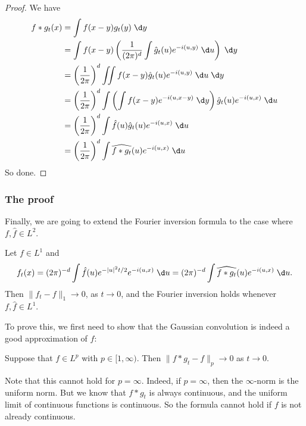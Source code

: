 \documentclass[a4paper]{article}
\begin{document}
\begin{proof}
  We have
  \begin{align*}
    f * g_t(x) &= \int f(x - y) g_t(y) \;\d y\\
    &= \int f(x - y) \left(\frac{1}{(2\pi)^d} \int \hat{g}_t(u) e^{-i(u, y)}\;\d u\right)\;\d y\\
    &= \left(\frac{1}{2\pi}\right)^d \iint f(x - y) \hat{g}_t(u) e^{-i(u, y)}\;\d u\;\d y\\
    &= \left(\frac{1}{2\pi}\right)^d \int \left(\int f(x - y) e^{-i(u, x - y)} \;\d y\right) \hat{g}_t(u) e^{-i(u, x)}\;\d u\\
    &= \left(\frac{1}{2\pi}\right)^d \int \hat{f}(u)\hat{g}_t(u) e^{-i(u, x)}\;\d u\\
    &= \left(\frac{1}{2\pi}\right)^d \int \widehat{f * g_t}(u) e^{-i(u, x)}\;\d u
  \end{align*}
  So done.
\end{proof}

\subsubsection*{The proof}
Finally, we are going to extend the Fourier inversion formula to the case where $f, \hat{f} \in L^2$.
\begin{thm}
  Let $f \in L^1$ and
  \[
    f_t(x) = (2\pi)^{-d} \int \hat{f}(u) e^{-|u|^2 t/2} e^{-i(u, x)}\;\d u = (2\pi)^{-d} \int \widehat{f * g_t}(u) e^{-i(u, x)}\;\d u.
  \]
  Then $\|f_t - f\|_1 \to 0$, as $t \to 0$, and the Fourier inversion holds whenever $f, \hat{f} \in L^1$.
\end{thm}

To prove this, we first need to show that the Gaussian convolution is indeed a good approximation of $f$:
\begin{lemma}
  Suppose that $f \in L^p$ with $p \in [1, \infty)$. Then $\|f * g_t - f\|_p \to 0$ as $t \to 0$.
\end{lemma}
Note that this cannot hold for $p = \infty$. Indeed, if $p = \infty$, then the $\infty$-norm is the uniform norm. But we know that $f * g_t$ is always continuous, and the uniform limit of continuous functions is continuous. So the formula cannot hold if $f$ is not already continuous.
\end{document}
